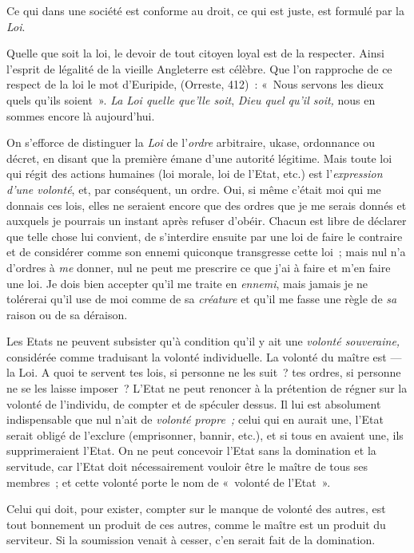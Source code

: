 \documentclass[french,twoside]{book} %
\begin{document}
\noindent Ce qui dans une société est conforme au droit, ce qui est juste, est formulé par la \emph{Loi}.\par
Quelle que soit la loi, le devoir de tout citoyen loyal est de la respecter. Ainsi l’esprit de légalité de la vieille Angleterre est célèbre. Que l’on rapproche de ce respect de la loi le mot d’Euripide, (Orreste, 412) : « Nous servons les dieux quels qu’ils soient ». \emph{La Loi quelle que’lle soit}, \emph{Dieu quel qu’il soit,} nous en sommes encore là aujourd’hui.\par
On s’efforce de distinguer la \emph{Loi} de l’\emph{ordre} arbitraire, ukase, ordonnance ou décret, en disant que la première émane d’une autorité légitime. Mais toute loi qui régit des actions humaines (loi morale, loi de l’Etat, etc.) est l’\emph{expression d’une volonté}, et, par conséquent, un ordre. Oui, si même c’était moi qui me donnais ces lois, elles ne seraient encore que des ordres que je me serais donnés et auxquels je pourrais un instant après refuser d’obéir. Chacun est libre de déclarer que telle chose lui convient, de s’interdire ensuite par une loi de faire le contraire et de considérer comme son ennemi quiconque transgresse cette loi ; mais nul n’a d’ordres à \emph{me} donner, nul ne peut me prescrire ce que j’ai à faire et m’en faire une loi. Je dois bien accepter qu’il me traite en \emph{ennemi}, mais jamais je ne tolérerai qu’il use de moi comme de sa \emph{créature} et qu’il me fasse une règle de \emph{sa} raison ou de sa déraison.\par
 Les Etats ne peuvent subsister qu’à condition qu’il y ait une \emph{volonté souveraine,} considérée comme traduisant la volonté individuelle. La volonté du maître est — la Loi. A quoi te servent tes lois, si personne ne les suit ? tes ordres, si personne ne se les laisse imposer ? L’Etat ne peut renoncer à la prétention de régner sur la volonté de l’individu, de compter et de spéculer dessus. Il lui est absolument indispensable que nul n’ait de \emph{volonté propre ;} celui qui en aurait une, l’Etat serait obligé de l’exclure (emprisonner, bannir, etc.), et si tous en avaient une, ils supprimeraient l’Etat. On ne peut concevoir l’Etat sans la domination et la servitude, car l’Etat doit nécessairement vouloir être le maître de tous ses membres ; et cette volonté porte le nom de « volonté de l’Etat ».\par
Celui qui doit, pour exister, compter sur le manque de volonté des autres, est tout bonnement un produit de ces autres, comme le maître est un produit du serviteur. Si la soumission venait à cesser, c’en serait fait de la domination.\par
\end{document}
